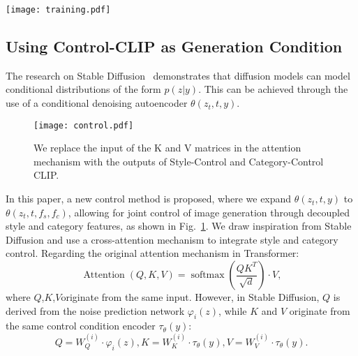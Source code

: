 \begin{figure*}[h!]
\begin{center}
\texttt{[image: training.pdf]}
\end{center}
   \caption{Training style encoder in Control-CLIP. Left: On datasets with style labels, Control-CLIP separates category and style features through cross-entropy loss, achieving better performance but requires higher annotation requirements.  Right: On datasets without style labels, we can utilize image captions to obtain style information. Control-CLIP uses a triplet loss function to distinguish between category and style features. The category encoder is trained similarly with an inverted loss function.
}
\label{fig:train}
\end{figure*}

\subsection{Using Control-CLIP as Generation Condition}
The research on Stable Diffusion~\cite{rombach2022high} demonstrates that diffusion models can model conditional distributions of the form $p(z|y)$. This can be achieved through the use of a conditional denoising autoencoder $\theta(z_t, t, y)$. 
\begin{figure}[t]
\begin{center}
\texttt{[image: control.pdf]}
\end{center}
   \caption{We replace the input of the K and V matrices in the attention mechanism with the outputs of Style-Control and Category-Control CLIP.}
\label{fig:free}
\end{figure}
In this paper, a new control method is proposed, where we expand $\theta(z_t, t, y)$ to $\theta(z_t, t,f_s,f_c)$, allowing for joint control of image generation through decoupled style and category features, as shown in Fig.~\ref{fig:free}. 
We draw inspiration from Stable Diffusion and use a cross-attention mechanism to integrate style and category control.
Regarding the original attention mechanism in Transformer:
\begin{equation}
\operatorname{Attention}(Q, K, V)=\operatorname{softmax}\left(\frac{Q K^T}{\sqrt{d}}\right) \cdot V,
\end{equation}
where $Q$,$K$,$V$originate from the same input.
However, in Stable Diffusion, $Q$ is derived from the noise prediction network $\varphi_i\left(z\right)$, while $K$ and $V$ originate from the same control condition encoder $\tau_\theta(y)$:
\begin{equation}
Q=W_Q^{(i)} \cdot \varphi_i\left(z\right), K=W_K^{(i)} \cdot \tau_\theta(y), V=W_V^{(i)} \cdot \tau_\theta(y).
\end{equation}

